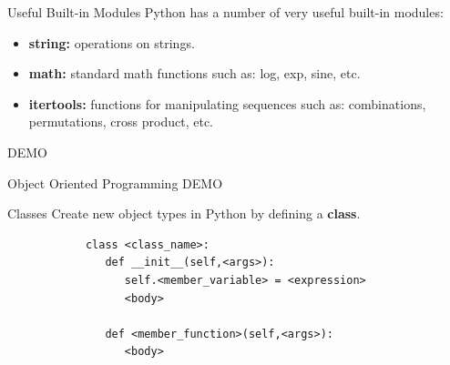 \documentclass[serif,xcolor=pdftex,dvipsnames,table,hyperref={bookmarks=false,breaklinks}]{beamer}
\begin{document}
\begin{frame}[t]{Useful Built-in Modules}
	Python has a number of very useful built-in modules:

	\begin{itemize}[<+->]
		\item \textbf{string:} operations on strings.
		\item \textbf{math:} standard math functions such as: log, exp, sine, etc.
		\item \textbf{itertools:} functions for manipulating sequences such as: combinations, permutations, cross product, etc.
	\end{itemize}
	\pause
	\centering
	\Huge{DEMO}
\end{frame}

\begin{frame}[t]{Object Oriented Programming}
	\Huge{DEMO}
\end{frame}

\begin{frame}[t,fragile]{Classes}
	Create new object types in Python by defining a \textbf{class}.
	\pause
	\begin{tcolorbox}
		\begin{verbatim}
			class <class_name>:
			   def __init__(self,<args>):
			      self.<member_variable> = <expression>
			      <body>
					
			   def <member_function>(self,<args>):
			      <body>
		\end{verbatim}
	\end{tcolorbox}
\end{frame}
\end{document}
